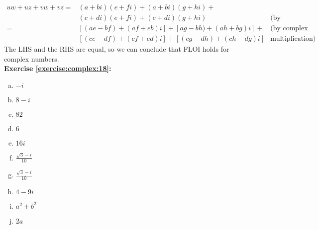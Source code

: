\begin{align*}
uw + uz + vw + vz = &(a + bi)(e + fi) + (a + bi)(g + hi) +\\
&(c + di)(e + fi) + (c + di)(g + hi)&  \text{(by substitution)}& \\
= &[(ae - bf) + (af + eb)i] + [ag -bh) + (ah + bg)i] + & \text{(by complex }\\
&[(ce - df) + (cf + ed)i] + [(cg - dh) + (ch - dg)i]& \text{multiplication)}
\end{align*}
The LHS and the RHS are equal, so we can conclude that FLOI holds for complex numbers.\\

\noindent\textbf{Exercise \ref{exercise:complex:18}:}%
\begin{multicols}{2}
\begin{enumerate}[(a)]
\item
$-i$

\item
$8-i$

\item
$82$

\item 
$6$

\item
$16i$

\item 
$\displaystyle\frac{\sqrt{3}-i}{10}$

\item 
$\displaystyle\frac{\sqrt{3}-i}{10}$

\item 
$4-9i$

\item
$a^{2}+b^{2}$

\item
$2a$
\end{enumerate}
\end{multicols}

